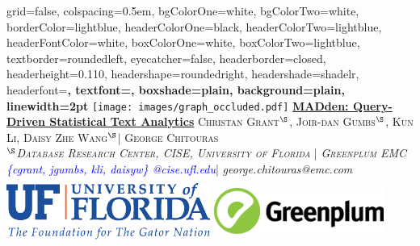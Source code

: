\documentclass[landscape,final,a0paper,fontscale=0.285]{baposter}
\begin{document}
		\begin{poster}%
		  {
		  grid=false,
		  colspacing=0.5em,
		  bgColorOne=white,
		  bgColorTwo=white,
		  borderColor=lightblue,
		  headerColorOne=black,
		  headerColorTwo=lightblue,
		  headerFontColor=white,
		  boxColorOne=white,
		  boxColorTwo=lightblue,
		  textborder=roundedleft,
		  eyecatcher=false,
		  headerborder=closed,
		  headerheight=0.110\textheight,
		  headershape=roundedright,
		  headershade=shadelr,
		  headerfont=\Large\bf\textsc, %
		  textfont={\setlength{\parindent}{1.2em}},
		  boxshade=plain,
		  background=plain,
		  linewidth=2pt
		  }
		  {\texttt{[image: images/graph\_occluded.pdf]}} 
		  {\vspace*{2pt}\bf{\underline{MADden: Query-Driven Statistical Text Analytics}}\vspace{-0.10em}}
		  {\textsc{ Christan Grant$^{\S}$, Joir-dan Gumbs$^{\S}$, Kun Li, Daisy Zhe Wang$^{\S}$| George Chitouras\\    
		                    {$^{\S}$\textit{Database Research Center, CISE, University of Florida} | \textit{Greenplum EMC} }}\\
		             {\textit{\textcolor{blue} {\{cgrant, jgumbs, kli, daisyw\} @cise.ufl.edu}}| \textit{george.chitouras@emc.com}  }}
		  {%
		    \includegraphics[height=6.0em, width=18.0em]{logo/UF_Signature_Themeline.pdf}
		    \includegraphics[height=6.0em, width=15.0em]{logo/gp_logo.jpg}
		  }\vspace{-3mm}
		

\end{poster}
\end{document}
